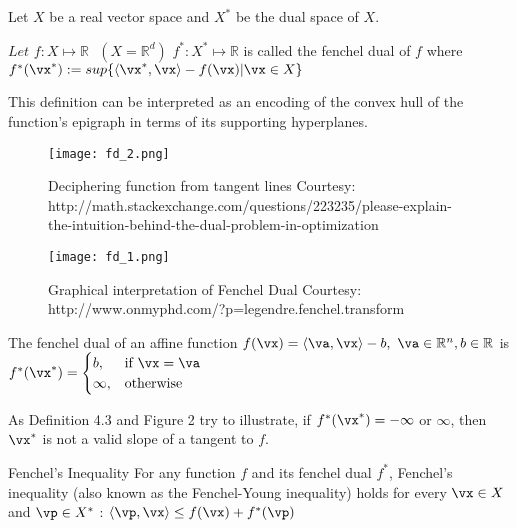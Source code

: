 \documentclass[a4paper,11pt]{article}
\begin{document}
\begin{definition}
Let $X$ be a real vector space and $X^*$ be the dual space of $X$.
\end{definition} 

\begin{definition}
\(Let \,\, f : X \mapsto \mathbb{R}\,\,\,\, (X=\mathbb{R}^d)\)
\newline
 \( f^* : X^* \mapsto \mathbb{R}\) is called the fenchel dual of $f$ where \newline
 \( f^*(\vx^*) :=  sup\{ \langle \vx^*,\vx\rangle - f(\vx) | \vx \in X \} \)
\end{definition}
This definition can be interpreted as an encoding of the convex hull of the function's epigraph in terms of its supporting hyperplanes.\cite{frank}

\begin{figure}[ht!]
\centering
\texttt{[image: fd\_2.png]}
\caption{Deciphering function from tangent lines \newline Courtesy: http://math.stackexchange.com/questions/223235/please-explain-the-intuition-behind-the-dual-problem-in-optimization }
\end{figure}

\begin{figure}[ht!]
\centering
\texttt{[image: fd\_1.png]}
\caption{Graphical interpretation of Fenchel Dual  \newline Courtesy: http://www.onmyphd.com/?p=legendre.fenchel.transform }
\end{figure}


\begin{example}
The fenchel dual of an affine function \newline
\( f(\vx) = \langle \va,\vx \rangle -b, \,\, \va \in \mathbb{R}^n, b \in \mathbb{R} \) \newline
is \newline
\( f^*(\vx^*) =
 \begin{cases}
    b, & \text{if } \vx= \va\\
    \infty,              & \text{otherwise}
\end{cases}
\)
\end{example}


As Definition 4.3 and Figure 2 try to illustrate, if \(f^* (\vx^*) = -\infty\) or \( \infty \), then $\vx^*$ is not a valid slope of a tangent to $f$.

\begin{proposition}
Fenchel's Inequality \newline
For any function $f$ and its fenchel dual $f^*$,  Fenchel's inequality (also known as the Fenchel-Young inequality) holds for every $\vx \in X$ and $\vp \in X^*$ : \newline \newline
\( \langle \vp,\vx \rangle \leq f(\vx) + f^*(\vp)\) 
\cite{wiki:001}
\end{proposition}
\end{document}
